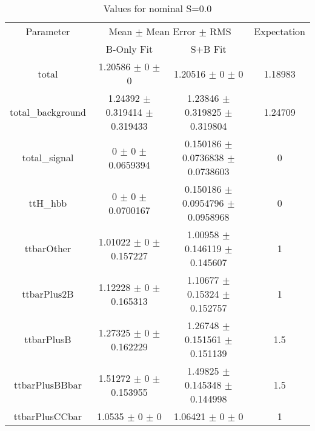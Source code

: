 \begin{table}
\centering
\caption{Values for nominal S=0.0}
\begin{tabular}{cccc}
\toprule
Parameter & \multicolumn{2}{c}{Mean $\pm$ Mean Error $\pm$ RMS} & Expectation\\
 & B-Only Fit & S+B Fit & \\
\midrule
total & \num{1.20586} $\pm$ \num{0} $\pm$ \num{0} & \num{1.20516} $\pm$ \num{0} $\pm$ \num{0} & \num{1.18983}\\
total\_background & \num{1.24392} $\pm$ \num{0.319414} $\pm$ \num{0.319433} & \num{1.23846} $\pm$ \num{0.319825} $\pm$ \num{0.319804} & \num{1.24709}\\
total\_signal & \num{0} $\pm$ \num{0} $\pm$ \num{0.0659394} & \num{0.150186} $\pm$ \num{0.0736838} $\pm$ \num{0.0738603} & \num{0}\\
ttH\_hbb & \num{0} $\pm$ \num{0} $\pm$ \num{0.0700167} & \num{0.150186} $\pm$ \num{0.0954796} $\pm$ \num{0.0958968} & \num{0}\\
ttbarOther & \num{1.01022} $\pm$ \num{0} $\pm$ \num{0.157227} & \num{1.00958} $\pm$ \num{0.146119} $\pm$ \num{0.145607} & \num{1}\\
ttbarPlus2B & \num{1.12228} $\pm$ \num{0} $\pm$ \num{0.165313} & \num{1.10677} $\pm$ \num{0.15324} $\pm$ \num{0.152757} & \num{1}\\
ttbarPlusB & \num{1.27325} $\pm$ \num{0} $\pm$ \num{0.162229} & \num{1.26748} $\pm$ \num{0.151561} $\pm$ \num{0.151139} & \num{1.5}\\
ttbarPlusBBbar & \num{1.51272} $\pm$ \num{0} $\pm$ \num{0.153955} & \num{1.49825} $\pm$ \num{0.145348} $\pm$ \num{0.144998} & \num{1.5}\\
ttbarPlusCCbar & \num{1.0535} $\pm$ \num{0} $\pm$ \num{0} & \num{1.06421} $\pm$ \num{0} $\pm$ \num{0} & \num{1}\\
\bottomrule
\end{tabular}
\end{table}